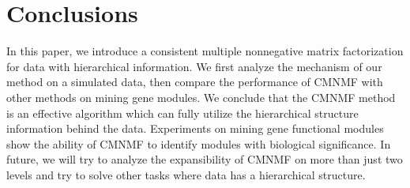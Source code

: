 \documentclass{bmcart}
\begin{document}
\section*{Conclusions}
In this paper, we introduce a consistent multiple nonnegative matrix factorization for data with hierarchical information. We first analyze the mechanism of our method on a simulated data, then compare the performance of CMNMF with other methods on mining gene modules. We conclude that the CMNMF method is an effective algorithm which can fully utilize the hierarchical structure information behind the data. Experiments on mining gene functional modules show the ability of CMNMF to identify modules with biological significance. In future, we will try to analyze the expansibility of CMNMF on more than just two levels and try to solve other tasks where data has a hierarchical structure.


\end{document}

